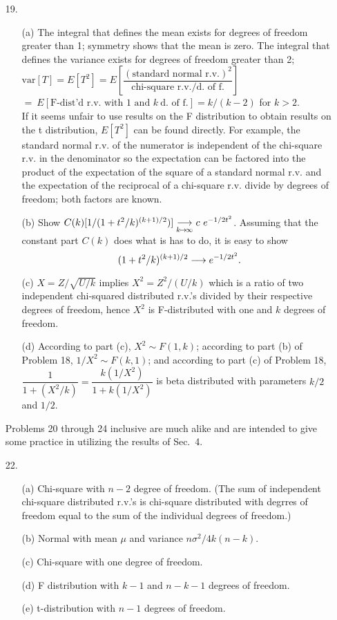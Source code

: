 \begin{enumerate}
	\newpage

	\item[19.]  \begin{enumerate}
		\item[(a)] The integral that defines the mean exists for degrees of freedom greater than 1; symmetry shows that the mean is zero. The integral that defines the variance exists for degrees of freedom greater than 2; \\
		$\mbox{var}[T] = E[T^2] = E[\dfrac{(\mbox{standard normal r.v.})^2}{\mbox{chi-square r.v./d.\ of f.}}]$ \\
		$=\ E[\mbox{F-dist'd r.v.\ with 1 and }k\ \mbox{d.\ of f.}] = k/(k-2)$ for $k>2$.	\\
		If it seems unfair to use results on the F distribution to obtain results on the t distribution, $E[T^2]$ can be found directly. For example, the standard normal r.v. of the numerator is independent of the chi-square r.v. in the denominator so the expectation can be factored into the product of the expectation of the square of a standard normal r.v. and the expectation of the reciprocal of a chi-square r.v. divide by degrees of freedom; both factors are known.
		\item[(b)] Show $C(k)[1/(1+t^2/k)^{(k+1)/2})] \underset {\tiny {k\! \to\! \infty}}{ \longrightarrow} c\ e^{-{\small 1/2}t^2}$.
		Assuming that the constant part $C(k)$ does what is has to do, it is easy to show 
		\[(1 + t^2/k)^{(k+1)/2} \longrightarrow e^{-{\small 1/2}t^2}. \]
		\item[(c)] $X = Z/\sqrt{U/k}$ implies $X^2 = Z^2/(U/k)$ which is a ratio of two independent chi-squared distributed r.v.'s divided by their respective degrees of freedom, hence $X^2$ is F-distributed with one and $k$ degrees of freedom.
		\item[(d)] According to part (c), $X^2\sim F(1,k)$; according to part (b) of Problem 18, $1/X^2\sim F(k,1)$; and according to part (c) of Problem 18, $\dfrac{1}{1+(X^2/k)} = \dfrac{k(1/X^2)}{1+k(1/X^2)}$ is beta distributed with parameters $k/2$ and $1/2$.
	\end{enumerate}

Problems 20 through 24 inclusive are much alike and are intended to give some practice in utilizing the results of Sec.\ 4.

	\item[22.] \begin{enumerate}
		\item[(a)] Chi-square with $n-2$ degree of freedom. (The sum of independent chi-square distributed r.v.'s is chi-square distributed with degrres of freedom equal to the sum of the individual degrees of freedom.)	
		\item[(b)] Normal with mean $\mu$ and variance $n\sigma^2/4k(n-k)$.
		\item[(c)] Chi-square with one degree of freedom.
		\item[(d)] F distribution with $k-1$ and $n-k-1$ degrees of freedom.
		\item[(e)] t-distribution with $n-1$ degrees of freedom.
	\end{enumerate}


\end{enumerate}
